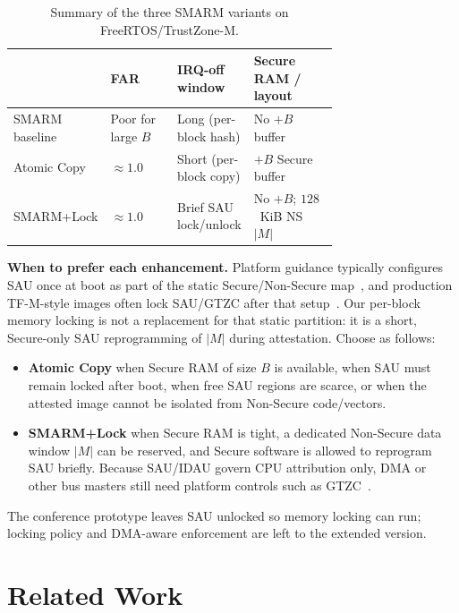 \documentclass[conference]{IEEEtran}
\newcommand{\smarmlock}{SMARM+Lock\xspace}
\begin{document}
\begin{table}[!t]
  \centering
  \small
  \caption{Summary of the three SMARM variants on FreeRTOS/TrustZone-M.}
  \label{tab:metric_summary}
  \setlength{\tabcolsep}{2.8pt}
  \renewcommand{\arraystretch}{1.15}
  \begin{tabular}{lp{0.22\linewidth}p{0.22\linewidth}p{0.28\linewidth}}
    \toprule
    & \textbf{FAR} & \textbf{IRQ-off window} & \textbf{Secure RAM / layout} \\
    \midrule
    SMARM baseline &
      Poor for large $B$ &
      Long (per-block hash) &
      No $+B$ buffer \\
    Atomic Copy &
      $\approx 1.0$ &
      Short (per-block copy) &
      $+B$ Secure buffer \\
    \smarmlock &
      $\approx 1.0$ &
      Brief SAU lock/unlock &
      No $+B$; $128$~KiB NS $|M|$ \\
    \bottomrule
  \end{tabular}
\end{table}

\textbf{When to prefer each enhancement.}
Platform guidance typically configures SAU once at boot as part of the
static Secure/Non-Secure map~\cite{armv8m-arm,an5347,cmsis-tz,tfm-isolation},
and production TF-M-style images often lock SAU/GTZC after that
setup~\cite{um2851,tfm2024}.
Our per-block memory locking is not a replacement for that static
partition: it is a short, Secure-only SAU reprogramming of $|M|$ during
attestation.
Choose as follows:

\begin{itemize}
  \item \textbf{Atomic Copy} when Secure RAM of size $B$ is available,
    when SAU must remain locked after boot, when free SAU regions are
    scarce, or when the attested image cannot be isolated from Non-Secure
    code/vectors.
  \item \textbf{\smarmlock} when Secure RAM is tight, a dedicated
    Non-Secure data window $|M|$ can be reserved, and Secure software is
    allowed to reprogram SAU briefly. Because SAU/IDAU govern CPU
    attribution only, DMA or other bus masters still need platform
    controls such as GTZC~\cite{an5347}.
\end{itemize}
The conference prototype leaves SAU unlocked so memory locking can
run; locking policy and DMA-aware enforcement are left to the
extended version.

\section{Related Work}
\label{sec:related}
\end{document}
